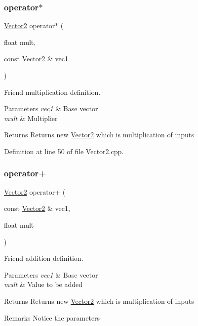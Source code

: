\subsubsection{\texorpdfstring{operator$\ast$}{operator*}}
{\footnotesize\ttfamily \mbox{\hyperlink{classVector2}{Vector2}} operator$\ast$ (\begin{DoxyParamCaption}\item[{float}]{mult,  }\item[{const \mbox{\hyperlink{classVector2}{Vector2}} \&}]{vec1 }\end{DoxyParamCaption})\hspace{0.3cm}{\ttfamily [friend]}}



Friend multiplication definition. 


\begin{DoxyParams}{Parameters}
{\em vec1} & Base vector \\
\hline
{\em mult} & Multiplier \\
\hline
\end{DoxyParams}
\begin{DoxyReturn}{Returns}
Returns new \mbox{\hyperlink{classVector2}{Vector2}} which is multiplication of inputs 
\end{DoxyReturn}


Definition at line 50 of file Vector2.\+cpp.

\mbox{\label{classVector2_a1ce2215611e761b7b1ca2f9f0dcdeb12}} 
\subsubsection{\texorpdfstring{operator+}{operator+}\hspace{0.1cm}{\footnotesize\ttfamily [1/2]}}
{\footnotesize\ttfamily \mbox{\hyperlink{classVector2}{Vector2}} operator+ (\begin{DoxyParamCaption}\item[{const \mbox{\hyperlink{classVector2}{Vector2}} \&}]{vec1,  }\item[{float}]{mult }\end{DoxyParamCaption})\hspace{0.3cm}{\ttfamily [friend]}}



Friend addition definition. 


\begin{DoxyParams}{Parameters}
{\em vec1} & Base vector \\
\hline
{\em mult} & Value to be added \\
\hline
\end{DoxyParams}
\begin{DoxyReturn}{Returns}
Returns new \mbox{\hyperlink{classVector2}{Vector2}} which is multiplication of inputs 
\end{DoxyReturn}
\begin{DoxyRemark}{Remarks}
Notice the parameters 
\end{DoxyRemark}


